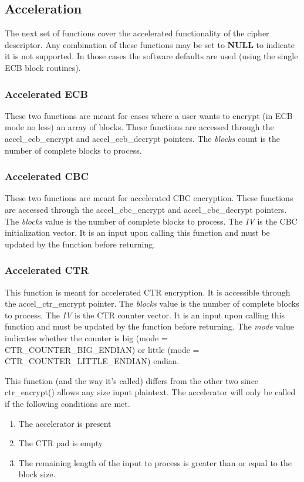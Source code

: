 \documentclass[synpaper]{book}
\begin{document}
\subsection{Acceleration}
The next set of functions cover the accelerated functionality of the cipher descriptor.  Any combination of these functions may be set to \textbf{NULL} to indicate
it is not supported.  In those cases the software defaults are used (using the single ECB block routines).

\subsubsection{Accelerated ECB}
These two functions are meant for cases where a user wants to encrypt (in ECB mode no less) an array of blocks.  These functions are accessed
through the accel\_ecb\_encrypt and accel\_ecb\_decrypt pointers.  The \textit{blocks} count is the number of complete blocks to process.

\subsubsection{Accelerated CBC}
These two functions are meant for accelerated CBC encryption.  These functions are accessed through the accel\_cbc\_encrypt and accel\_cbc\_decrypt pointers.
The \textit{blocks} value is the number of complete blocks to process.  The \textit{IV} is the CBC initialization vector.  It is an input upon calling this function and must be
updated by the function before returning.

\subsubsection{Accelerated CTR}
This function is meant for accelerated CTR encryption.  It is accessible through the accel\_ctr\_encrypt pointer.
The \textit{blocks} value is the number of complete blocks to process.  The \textit{IV} is the CTR counter vector.  It is an input upon calling this function and must be
updated by the function before returning.  The \textit{mode} value indicates whether the counter is big (mode = CTR\_COUNTER\_BIG\_ENDIAN) or
little (mode = CTR\_COUNTER\_LITTLE\_ENDIAN) endian.

This function (and the way it's called) differs from the other two since ctr\_encrypt() allows any size input plaintext.  The accelerator will only be
called if the following conditions are met.

\begin{enumerate}
   \item The accelerator is present
   \item The CTR pad is empty
   \item The remaining length of the input to process is greater than or equal to the block size.
\end{enumerate}
\end{document}
